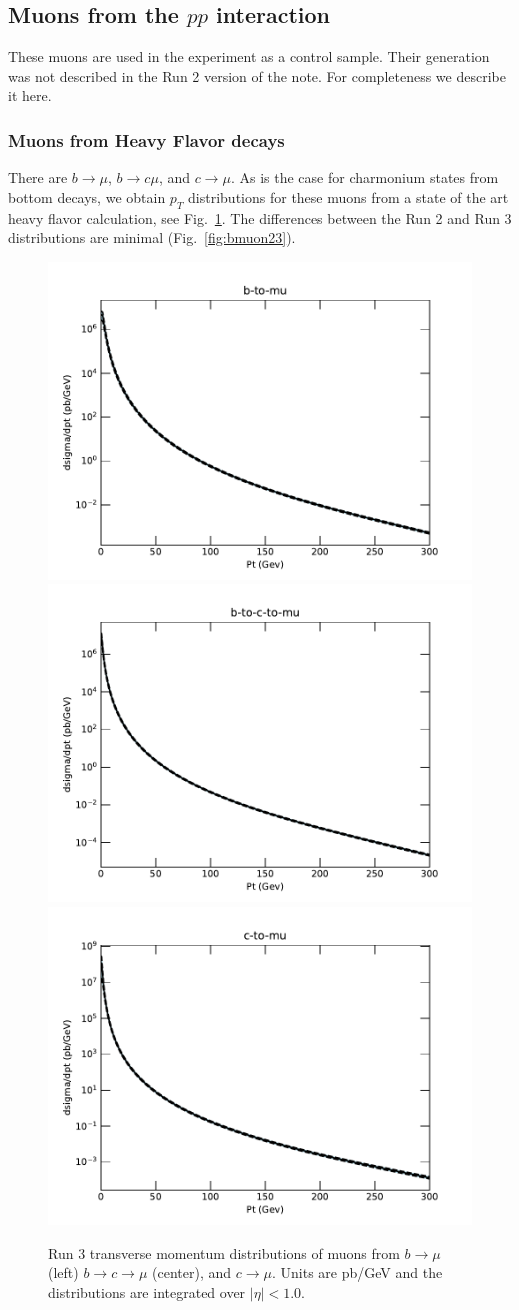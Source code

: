 \documentclass[12pt]{article}
\begin{document}
\clearpage

\subsection{Muons from the $pp$ interaction}
These muons are used in the experiment as a control sample.
Their generation was not described in the Run 2 version of the note.  For completeness we describe it here.

\subsubsection{Muons from Heavy Flavor decays}
There are $b \to \mu$, $b \to c \mu$, and $c \to \mu$.  As is the case
for charmonium states from bottom decays, we obtain $p_T$ distributions for these muons from a state of the art heavy flavor calculation\cite{Cacciari:2012ny,Cacciari:2015fta}, see Fig.~\ref{fig:bmuon}.  The differences between the Run 2 and Run 3
distributions are minimal (Fig.~\ref{fig:bmuon23}).

\begin{figure}[H]
\includegraphics[width=0.31\linewidth]{../muons/data/run3/b-to-mu.pdf}  
\includegraphics[width=0.31\linewidth]{../muons/data/run3/b-to-c-to-mu.pdf}  
\includegraphics[width=0.31\linewidth]{../muons/data/run3/c-to-mu.pdf}  
\caption{Run 3 transverse momentum distributions of muons from $b \to \mu$ (left)
  $b \to c \to \mu$ (center), and $c \to \mu$.
Units are pb/GeV and the 
distributions 
are integrated over $|\eta|<1.0$.}
  \label{fig:bmuon}
\end{figure}
\end{document}
